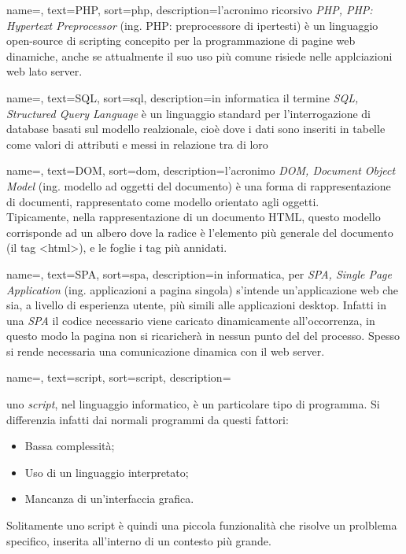 {
	name=,
	text=PHP,
	sort=php,
	description={l'acronimo ricorsivo \emph{PHP, PHP: Hypertext Preprocessor} (ing. PHP: preprocessore di ipertesti) è un linguaggio open-source di scripting concepito per la programmazione di pagine web dinamiche, anche se attualmente il suo uso più comune risiede nelle applciazioni web lato server.}
}

{
	name=,
	text=SQL,
	sort=sql,
	description={in informatica il termine \emph{SQL, Structured Query Language} è un linguaggio standard per l'interrogazione di database basati sul modello realzionale, cioè dove i dati sono inseriti in tabelle come valori di attributi e messi in relazione tra di loro }
}

{
	name=,
	text=DOM,
	sort=dom,
	description={l'acronimo \emph{DOM, Document Object Model} (ing.  modello ad oggetti del documento) è una forma di rappresentazione di documenti, rappresentato come modello orientato agli oggetti.\\
	Tipicamente, nella rappresentazione di un documento HTML, questo modello corrisponde ad un albero dove la radice è l'elemento più generale del documento (il tag <html>), e le foglie i tag più annidati.}
}

{
	name=,
	text=SPA,
	sort=spa,
	description={in informatica, per \emph{SPA, Single Page Application} (ing. applicazioni a pagina singola) s'intende un'applicazione web che sia, a livello di esperienza utente, più simili alle applicazioni desktop. Infatti in una \emph{SPA} il codice necessario viene caricato dinamicamente all'occorrenza, in questo modo la pagina non si ricaricherà in nessun punto del del processo. Spesso si rende necessaria una comunicazione dinamica con il web server.}
}


{
	name=,
	text=script,
	sort=script,
	description={uno \emph{script}, nel linguaggio informatico, è un particolare tipo di programma. Si differenzia infatti dai normali programmi da questi fattori:
	\begin{itemize}
		\item Bassa complessità;
		\item Uso di un linguaggio interpretato;
		\item Mancanza di un'interfaccia grafica.
	\end{itemize}
	Solitamente uno script è quindi una piccola funzionalità che risolve un prolblema specifico, inserita all'interno di un contesto più grande.}
}

